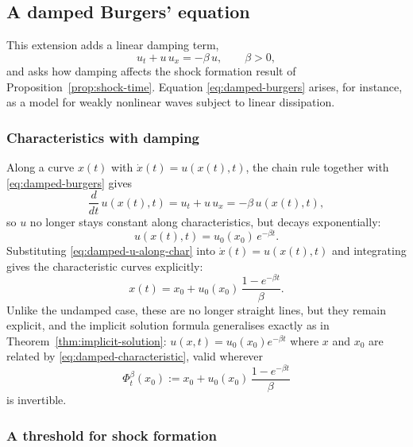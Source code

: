 \subsection{A damped Burgers' equation}
\label{subsec:damped-burgers}

This extension adds a linear damping term,
\begin{equation}
  \label{eq:damped-burgers}
  u_t + u\, u_x = -\beta\, u, \qquad \beta > 0,
\end{equation}
and asks how damping affects the shock formation result of
Proposition~\ref{prop:shock-time}. Equation \eqref{eq:damped-burgers}
arises, for instance, as a model for weakly nonlinear waves subject to
linear dissipation.

\subsubsection{Characteristics with damping}
\label{subsubsec:damped-characteristics}

Along a curve $x(t)$ with $\dot x(t) = u(x(t),t)$, the chain rule together
with \eqref{eq:damped-burgers} gives
\begin{equation}
  \frac{d}{dt}\, u(x(t),t) = u_t + u\, u_x = -\beta\, u(x(t),t),
\end{equation}
so $u$ no longer stays constant along characteristics, but decays
exponentially:
\begin{equation}
  \label{eq:damped-u-along-char}
  u(x(t),t) = u_0(x_0)\, e^{-\beta t}.
\end{equation}
Substituting \eqref{eq:damped-u-along-char} into $\dot x(t)=u(x(t),t)$ and
integrating gives the characteristic curves explicitly:
\begin{equation}
  \label{eq:damped-characteristic}
  x(t) = x_0 + u_0(x_0)\, \frac{1-e^{-\beta t}}{\beta}.
\end{equation}
Unlike the undamped case, these are no longer straight lines, but they
remain explicit, and the implicit solution formula generalises exactly
as in Theorem~\ref{thm:implicit-solution}: $u(x,t) = u_0(x_0)e^{-\beta t}$
where $x$ and $x_0$ are related by \eqref{eq:damped-characteristic},
valid wherever
\begin{equation}
  \label{eq:damped-phi}
  \Phi_t^\beta(x_0) := x_0 + u_0(x_0)\,\frac{1-e^{-\beta t}}{\beta}
\end{equation}
is invertible.

\subsubsection{A threshold for shock formation}
\label{subsubsec:damping-threshold}


